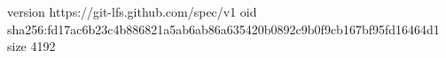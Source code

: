 version https://git-lfs.github.com/spec/v1
oid sha256:fd17ac6b23c4b886821a5ab6ab86a635420b0892c9b0f9cb167bf95fd16464d1
size 4192
